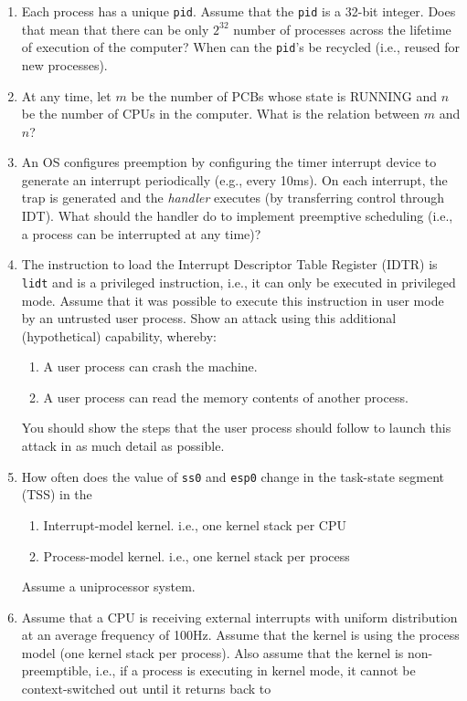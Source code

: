 \begin{enumerate}
\item Each process has a unique {\tt pid}. Assume that the {\tt pid} is a 32-bit integer.
Does that mean that there can be only $2^{32}$ number of processes across the lifetime
of execution of the computer? When can the {\tt pid}'s be recycled (i.e., reused for new
processes).
\item At any time, let $m$ be the number of PCBs whose state is RUNNING and $n$ be the
number of CPUs in the computer. What is the relation between $m$ and $n$?
\item An OS configures preemption by configuring the timer interrupt device to generate
an interrupt periodically (e.g., every 10ms). On each interrupt, the trap is generated
and the {\em handler} executes (by transferring control through IDT). What should the
handler do to implement preemptive scheduling (i.e., a process can be interrupted
at any time)?
\item The instruction to load the Interrupt Descriptor Table
Register (IDTR) is {\tt lidt} and is a privileged instruction, i.e., it can
only be executed in privileged mode. Assume that it was possible
to execute this instruction in user mode by an untrusted
user process. Show an attack using this additional (hypothetical)
capability, whereby:
\begin{enumerate}
\item A user process can crash the machine.
\item A user process can read the memory contents of another
process.
\end{enumerate}
You should show the steps that the user process should follow
to launch this attack in as much detail as possible.
\item How often does the value of {\tt ss0} and {\tt esp0} change in the
task-state segment (TSS) in the
\begin{enumerate}
\item Interrupt-model kernel. i.e., one kernel stack per CPU
\item Process-model kernel. i.e., one kernel stack per process
\end{enumerate}
Assume a uniprocessor system.
\item Assume that a CPU is receiving external
interrupts with uniform distribution at an average
frequency of 100Hz. Assume that the kernel is using the process model (one kernel
stack per process). Also assume that the kernel is non-preemptible, i.e., if a process
is executing in kernel mode, it cannot be context-switched out until it returns back to

\end{enumerate}
